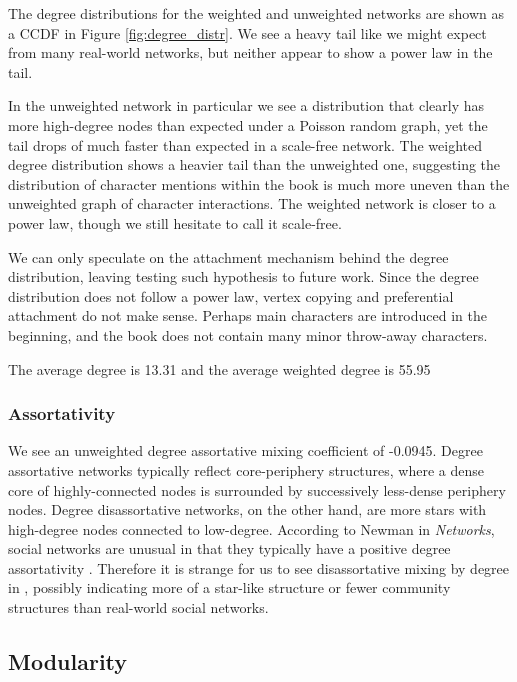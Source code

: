 The degree distributions for the weighted and unweighted networks are shown as a CCDF in Figure \ref{fig:degree_distr}. We see a heavy tail like we might expect from many real-world networks, but neither appear to show a power law in the tail. 

In the unweighted network in particular we see a distribution that clearly has more high-degree nodes than expected under a Poisson random graph, yet the tail drops of much faster than expected in a scale-free network.
The weighted degree distribution shows a heavier tail than the unweighted one, suggesting the distribution of character mentions within the book is much more uneven than the unweighted graph of character interactions. The weighted network is closer to a power law, though we still hesitate to call it scale-free.


We can only speculate on the attachment mechanism behind the degree distribution, leaving testing such hypothesis to future work. Since the degree distribution does not follow a power law, vertex copying and preferential attachment do not make sense. 
Perhaps main characters are introduced in the beginning, and the book does not contain many minor throw-away characters.

The average degree is 13.31 and the average weighted degree is 55.95

\subsubsection{Assortativity}
We see an unweighted degree assortative mixing coefficient of -0.0945.
Degree assortative networks typically reflect core-periphery structures, where a dense core of highly-connected nodes is surrounded by successively less-dense periphery nodes. Degree disassortative networks, on the other hand, are more stars with high-degree nodes connected to low-degree. 
According to Newman in {\em Networks}, social networks are unusual in that they typically have a positive degree assortativity \cite{NewmanBook}. 
Therefore it is strange for us to see disassortative mixing by degree in \infinitejest, possibly indicating more of a star-like structure or fewer community structures than real-world social networks.

\subsection{Modularity}

